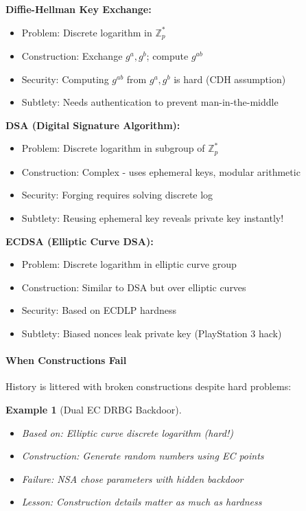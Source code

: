 \documentclass[11pt,a4paper]{article}
\newtheorem{example}{Example}
\begin{document}
\textbf{Diffie-Hellman Key Exchange:}
\begin{itemize}
    \item Problem: Discrete logarithm in $\mathbb{Z}_p^*$
    \item Construction: Exchange $g^a, g^b$; compute $g^{ab}$
    \item Security: Computing $g^{ab}$ from $g^a, g^b$ is hard (CDH assumption)
    \item Subtlety: Needs authentication to prevent man-in-the-middle
\end{itemize}

\textbf{DSA (Digital Signature Algorithm):}
\begin{itemize}
    \item Problem: Discrete logarithm in subgroup of $\mathbb{Z}_p^*$
    \item Construction: Complex - uses ephemeral keys, modular arithmetic
    \item Security: Forging requires solving discrete log
    \item Subtlety: Reusing ephemeral key reveals private key instantly!
\end{itemize}

\textbf{ECDSA (Elliptic Curve DSA):}
\begin{itemize}
    \item Problem: Discrete logarithm in elliptic curve group
    \item Construction: Similar to DSA but over elliptic curves
    \item Security: Based on ECDLP hardness
    \item Subtlety: Biased nonces leak private key (PlayStation 3 hack)
\end{itemize}

\paragraph{When Constructions Fail}

History is littered with broken constructions despite hard problems:

\begin{example}[Dual EC DRBG Backdoor]
\begin{itemize}
    \item Based on: Elliptic curve discrete logarithm (hard!)
    \item Construction: Generate random numbers using EC points
    \item Failure: NSA chose parameters with hidden backdoor
    \item Lesson: Construction details matter as much as hardness
\end{itemize}
\end{example}
\end{document}
